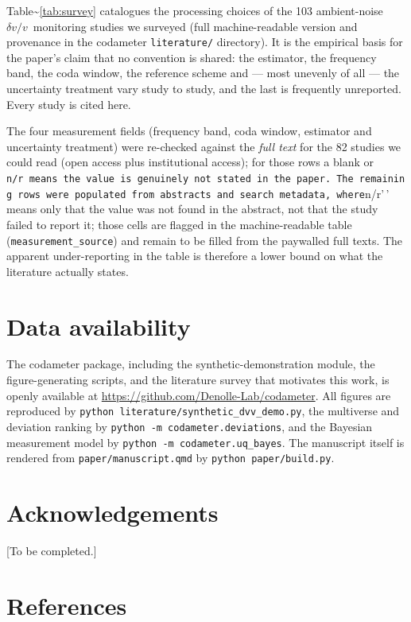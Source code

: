 \documentclass[
  11pt,
  letterpaper,
]{article}
\providecommand{\dvv}{\ensuremath{\delta v/v}}
\begin{document}
Table\textasciitilde{}\ref{tab:survey} catalogues the processing choices
of the 103 ambient-noise \dvv~monitoring studies we surveyed (full
machine-readable version and provenance in the codameter
\texttt{literature/} directory). It is the empirical basis for the
paper's claim that no convention is shared: the estimator, the frequency
band, the coda window, the reference scheme and --- most unevenly of all
--- the uncertainty treatment vary study to study, and the last is
frequently unreported. Every study is cited here.

The four measurement fields (frequency band, coda window, estimator and
uncertainty treatment) were re-checked against the \emph{full text} for
the 82 studies we could read (open access plus institutional access);
for those rows a blank or
\texttt{n/r\textquotesingle{}\textquotesingle{}\ means\ the\ value\ is\ genuinely\ not\ stated\ in\ the\ paper.\ The\ remaining\ rows\ were\ populated\ from\ abstracts\ and\ search\ metadata,\ where}n/r'\,'
means only that the value was not found in the abstract, not that the
study failed to report it; those cells are flagged in the
machine-readable table (\texttt{measurement\_source}) and remain to be
filled from the paywalled full texts. The apparent under-reporting in
the table is therefore a lower bound on what the literature actually
states.



\section*{Data availability}\label{data-availability}

The codameter package, including the synthetic-demonstration module, the
figure-generating scripts, and the literature survey that motivates this
work, is openly available at
\url{https://github.com/Denolle-Lab/codameter}. All figures are
reproduced by \texttt{python\ literature/synthetic\_dvv\_demo.py}, the
multiverse and deviation ranking by
\texttt{python\ -m\ codameter.deviations}, and the Bayesian measurement
model by \texttt{python\ -m\ codameter.uq\_bayes}. The manuscript itself
is rendered from \texttt{paper/manuscript.qmd} by
\texttt{python\ paper/build.py}.

\section*{Acknowledgements}\label{acknowledgements}

{[}To be completed.{]}

\section*{References}\label{references}

\renewcommand{\bibsection}{}

\end{document}
